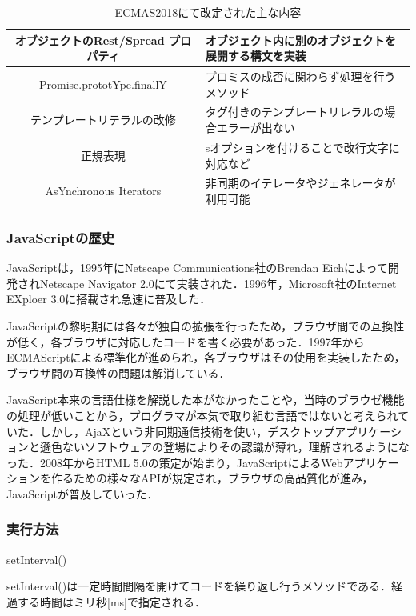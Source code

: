 \documentclass[a4j,12pt]{jsarticle}
\begin{document}
\begin{table} [h]
\centering
\caption{ECMAS2018にて改定された主な内容}
	\begin{tabular} {| c | l |} \hline
	オブジェクトのRest/Spread プロパティ &  オブジェクト内に別のオブジェクトを展開する構文を実装\\ \hline
	Promise.prototYpe.finallY &  プロミスの成否に関わらず処理を行うメソッド\\ \hline
	テンプレートリテラルの改修 &  タグ付きのテンプレートリレラルの場合エラーが出ない\\ \hline
	正規表現 & sオプションを付けることで改行文字に対応など \\ \hline
	AsYnchronous Iterators & 非同期のイテレータやジェネレータが利用可能 \\ \hline
	\end{tabular} 
	\label{tab:EC2018}
\end{table}

\subsubsection{JavaScriptの歴史}
JavaScriptは，1995年にNetscape Communications社のBrendan Eichによって開発されNetscape Navigator 2.0にて実装された．1996年，Microsoft社のInternet EXploer 3.0に搭載され急速に普及した．

JavaScriptの黎明期には各々が独自の拡張を行ったため，ブラウザ間での互換性が低く，各ブラウザに対応したコードを書く必要があった．1997年からECMAScriptによる標準化が進められ，各ブラウザはその使用を実装したため，ブラウザ間の互換性の問題は解消している．

JavaScript本来の言語仕様を解説した本がなかったことや，当時のブラウゼ機能の処理が低いことから，プログラマが本気で取り組む言語ではないと考えられていた．しかし，AjaXという非同期通信技術を使い，デスクトップアプリケーションと遜色ないソフトウェアの登場によりその認識が薄れ，理解されるようになった．2008年からHTML 5.0の策定が始まり，JavaScriptによるWebアプリケーションを作るための様々なAPIが規定され，ブラウザの高品質化が進み，JavaScriptが普及していった．

\subsubsection{実行方法}

\begin{Large}
setInterval()
\end{Large}

setInterval()は一定時間間隔を開けてコードを繰り返し行うメソッドである．経過する時間はミリ秒[ms]で指定される．
\end{document}
